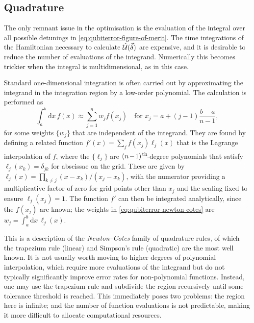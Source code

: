 \subsection{Quadrature}

The only remnant issue in the optimisation is the evaluation of the integral over all possible detunings in \cref{eq:qubiterror-figure-of-merit}.
The time integrations of the Hamiltonian necessary to calculate $\hat{\mathcal U}(\vec\delta)$ are expensive, and it is desirable to reduce the number of evaluations of the integrand.
Numerically this becomes trickier when the integral is multidimensional, as in this case.

Standard one-dimensional integration is often carried out by approximating the integrand in the integration region by a low-order polynomial.
The calculation is performed as
\begin{equation}\label{eq:qubiterror-newton-cotes}
\int_a^b \!\mathrm dx\,f(x) \approx \sum_{j=1}^n w_j f(x_j) \quad\text{for }x_j = a + (j - 1)\frac{b - a}{n-1},
\end{equation}
for some weights $\{w_j\}$ that are independent of the integrand.
They are found by defining a related function $f'(x) = \sum_j f(x_j)\ell_j(x)$ that is the Lagrange interpolation of $f$, where the $\{\ell_j\}$ are $\msquash{(n-1)}$\textsuperscript{th}-degree polynomials that satisfy $\ell_j(x_k) = \delta_{jk}$ for abscissae on the grid.
These are given by $\ell_j(x) = \prod_{k\ne j}(x-x_k)/(x_j-x_k)$, with the numerator providing a multiplicative factor of zero for grid points other than $x_j$ and the scaling fixed to ensure $\ell_j(x_j) = 1$.
The function $f'$ can then be integrated analytically, since the $f(x_j)$ are known; the weights in \cref{eq:qubiterror-newton-cotes} are $w_j = \int_a^b\!\mathrm dx\,\ell_j(x)$.

This is a description of the \emph{Newton--Cotes} family of quadrature rules, of which the trapezium rule (linear) and Simpson's rule (quadratic) are the most well known.
It is not usually worth moving to higher degrees of polynomial interpolation, which require more evaluations of the integrand but do not typically significantly improve error rates for non-polynomial functions.
Instead, one may use the trapezium rule and subdivide the region recursively until some tolerance threshold is reached.
This immediately poses two problems: the region here is infinite; and the number of function evaluations is not predictable, making it more difficult to allocate computational resources.

